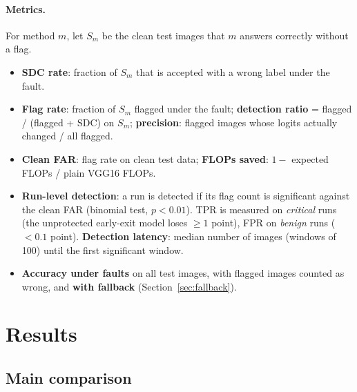 \documentclass[10pt,a4paper]{article}
\begin{document}
\paragraph{Metrics.} For method $m$, let $S_m$ be the clean test images that $m$ answers correctly
without a flag.
\begin{itemize}
  \item \textbf{SDC rate}: fraction of $S_m$ that is accepted with a wrong label under the fault.
  \item \textbf{Flag rate}: fraction of $S_m$ flagged under the fault; \textbf{detection ratio} =
        flagged / (flagged + SDC) on $S_m$; \textbf{precision}: flagged images whose logits actually
        changed / all flagged.
  \item \textbf{Clean FAR}: flag rate on clean test data; \textbf{FLOPs saved}: $1-$ expected FLOPs / plain
        VGG16 FLOPs.
  \item \textbf{Run-level detection}: a run is detected if its flag count is significant against the
        clean FAR (binomial test, $p<0.01$). TPR is measured on \emph{critical} runs (the unprotected
        early-exit model loses $\ge 1$ point), FPR on \emph{benign} runs ($<0.1$ point).
        \textbf{Detection latency}: median number of images (windows of 100) until the first significant
        window.
  \item \textbf{Accuracy under faults} on all test images, with flagged images counted as wrong, and
        \textbf{with fallback} (Section~\ref{sec:fallback}).
\end{itemize}

\section{Results}\label{sec:results}

\subsection{Main comparison}
\end{document}
